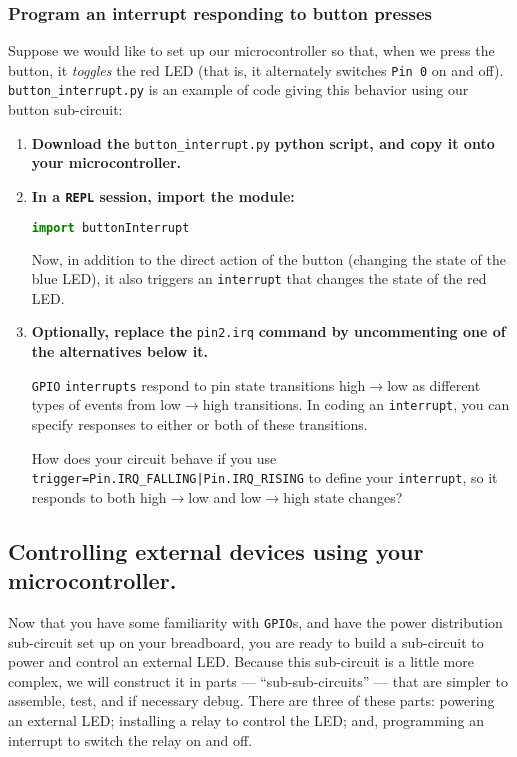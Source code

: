 \subsubsection{\howto Program an interrupt responding to button presses}
Suppose we would like to set up our microcontroller so that, when we press the button, it \emph{toggles} the red LED (that is, it alternately switches \texttt{Pin 0} on and off). \verb|button_interrupt.py| is an example of code giving this behavior using our button sub-circuit:
\begin{enumerate}
	\item \textbf{Download the} \lstinline{button_interrupt.py} \textbf{python script, and copy it onto your microcontroller.}
	
	\item \textbf{In a \texttt{REPL} session, import the module:}
\begin{lstlisting}[language=Python]
import buttonInterrupt
\end{lstlisting}	
	Now, in addition to the direct action of the button (changing the state of the blue LED), it also triggers an \texttt{interrupt} that changes the state of the red LED.
	\item \textbf{Optionally, replace the} \lstinline{pin2.irq} \textbf{command by uncommenting one of the alternatives below it.}
		
	\texttt{GPIO} \texttt{interrupts} respond to pin state transitions high$\rightarrow$low as different types of events from low$\rightarrow$high transitions.
	In coding an \texttt{interrupt}, you can specify responses to either or both of these transitions.
	
	\smallskip
	How does your circuit behave if you use \lstinline{trigger=Pin.IRQ_FALLING|Pin.IRQ_RISING} to define your \texttt{interrupt}, so it responds to both high$\rightarrow$low and low$\rightarrow$high state changes?
\end{enumerate}



\subsection{Controlling external devices using your microcontroller.}
Now that you have some familiarity with \texttt{GPIO}s, and have the power distribution sub-circuit set up on your breadboard, you are ready to build a sub-circuit to power and control an external LED. 
Because this sub-circuit is a little more complex, we will construct it in parts --- ``sub-sub-circuits'' --- that are simpler to assemble, test, and if necessary debug.
There are three of these parts: powering an external LED; installing a relay to control the LED; and, programming an interrupt to switch the relay on and off.
